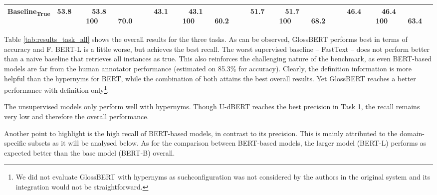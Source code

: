 \documentclass[11pt,a4paper]{article}
\begin{document}
\begin{table*}
{{\begin{tabular}{ll cc c cc c cc c cc}
\midrule

\multicolumn{2}{l}{Baseline\textsubscript{True}}  & 53.8   &   53.8~~~~~ 100~~~~~70.0   &      &   43.1   &   43.1~~~~~ 100~~~~~60.2   &      &   51.7   &   51.7~~~~~ 100~~~~~68.2   &      &   46.4   &   46.4~~~~~ 100~~~~~63.4  \\


\bottomrule
\end{tabular}
}
}
\caption{\label{tab:results_task_domain}
Performance for the baseline models for the three tasks (i.e., T1: definition-based, T2: hypernymy-based, and T3: both sources of information) split by domain: General ({WNT/WKT}), Cocktails ({CTL}), Medical Subjects ({MSH}), and Computer Science ({CPS}). Baseline\textsubscript{True} is a naive baseline that always returns ``True''. Human performance in terms of accuracy is estimated to be 82.1\% ({WNT/WKT}), 92.0\% ({CTL}), 89.1\% ({MSH}) and 86.5\% ({CPS}) as described in Section \ref{human-performance}.}
\end{table*}

Table \ref{tab:results_task_all} shows the overall results for the three tasks. As can be observed, GlossBERT performs best in terms of accuracy and F. BERT-L is a little worse, but achieves the best recall. 
The worst supervised baseline -- FastText -- does not perform better than a naive baseline that retrieves all instances as true. This also reinforces the challenging nature of the benchmark, as even BERT-based models are far from the human annotator performance (estimated on 85.3\% for accuracy). Clearly, the definition information is more helpful than the hypernyms for BERT, while the combination of both attains the best overall results. Yet GlossBERT reaches a better performance with definition only\footnote{We did not evaluate GlossBERT with hypernyms as suchconfiguration was not considered by the authors in the original system and its integration would not be straightforward.}. 

The unsupervised models only perform well with hypernyms. Though U-dBERT reaches the best precision in Task 1, the recall remains very low and therefore the overall performance.

Another point to highlight is the high recall of BERT-based models, in contrast to its precision.
This is mainly attributed to the domain-specific subsets as it will be analysed below. As for the comparison between BERT-based models, the larger model (BERT-L) performs as expected better than the base model (BERT-B) overall.
\end{document}
